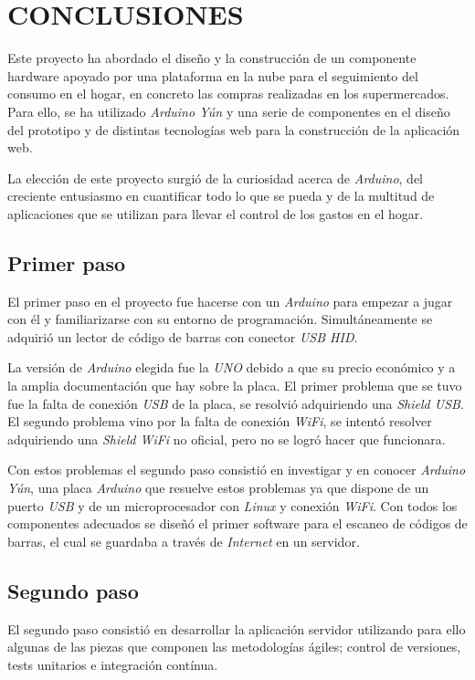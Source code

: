 \chapter{CONCLUSIONES}

Este proyecto ha abordado el diseño y la construcción de un componente hardware apoyado por una plataforma en la nube para el seguimiento del consumo en el hogar, en concreto las compras realizadas en los supermercados. Para ello, se ha utilizado \emph{Arduino Yún} y una serie de componentes en el diseño del prototipo y de distintas tecnologías web para la construcción de la aplicación web.

La elección de este proyecto surgió de la curiosidad acerca de \emph{Arduino}, del creciente entusiasmo en cuantificar todo lo que se pueda y de la multitud de aplicaciones que se utilizan para llevar el control de los gastos en el hogar.

\section{Primer paso}

El primer paso en el proyecto fue hacerse con un \emph{Arduino} para empezar a jugar con él y familiarizarse con su entorno de programación. Simultáneamente se adquirió un lector de código de barras con conector \emph{USB HID}.

La versión de \emph{Arduino} elegida fue la \emph{UNO} debido a que su precio económico y a la amplia documentación que hay sobre la placa. El primer problema que se tuvo fue la falta de conexión \emph{USB} de la placa, se resolvió adquiriendo una \emph{Shield USB}. El segundo problema vino por la falta de conexión \emph{WiFi}, se intentó resolver adquiriendo una \emph{Shield WiFi} no oficial, pero no se logró hacer que funcionara.

Con estos problemas el segundo paso consistió en investigar y en conocer \emph{Arduino Yún}, una placa \emph{Arduino} que resuelve estos problemas ya que dispone de un puerto \emph{USB} y de un microprocesador con \emph{Linux} y conexión \emph{WiFi}. Con todos los componentes adecuados se diseñó el primer software para el escaneo de códigos de barras, el cual se guardaba a través de \emph{Internet} en un servidor.

\section{Segundo paso}

El segundo paso consistió en desarrollar la aplicación servidor utilizando para ello algunas de las piezas que componen las metodologías ágiles; control de versiones, tests unitarios e integración contínua.

